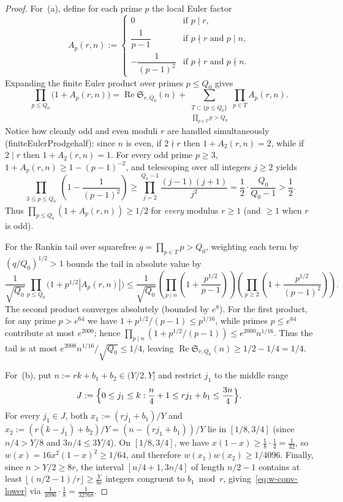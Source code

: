 \documentclass[11pt,reqno]{amsart}
\numberwithin{equation}{section}
\theoremstyle{definition}
\newcommand{\1}{\mathbf{1}}
\newcommand{\Sing}{\mathfrak{S}}
\renewcommand{\Re}{\operatorname{Re}}
\newcommand{\lean}[1]{{\footnotesize\ttfamily\renewcommand{\_}{\textunderscore\allowbreak}#1}}
\begin{document}
\begin{proof}
For~(a), define for each prime $p$ the local Euler factor
\[
  A_p(r, n) := \begin{cases}
    0 & \text{if } p \mid r,\\
    \dfrac{1}{p - 1} & \text{if } p \nmid r \text{ and } p \mid n,\\
    -\dfrac{1}{(p - 1)^2} & \text{if } p \nmid r \text{ and } p \nmid n.
  \end{cases}
\]
Expanding the finite Euler product over primes $p \le Q_0$ gives
\[
  \prod_{p \le Q_0} \bigl(1 + A_p(r, n)\bigr) = \Re \Sing_{r, Q_0}(n) + \sum_{\substack{T \subset \{p \le Q_0\} \\ \prod_{p \in T} p > Q_0}} \prod_{p \in T} A_p(r, n).
\]
Notice how cleanly odd and even moduli $r$ are handled simultaneously (\lean{finiteEulerProd\_ge\_half}): since $n$ is even, if $2 \nmid r$ then $1 + A_2(r, n) = 2$, while if $2 \mid r$ then $1 + A_2(r, n) = 1$. For every odd prime $p \ge 3$, $1 + A_p(r, n) \ge 1 - (p-1)^{-2}$, and telescoping over all integers $j \ge 2$ yields
\[
  \prod_{\substack{3 \le p \le Q_0}} \left(1 - \frac{1}{(p-1)^2}\right)
  \ge \prod_{j=2}^{Q_0 - 1} \frac{(j-1)(j+1)}{j^2}
  = \frac{1}{2}\cdot \frac{Q_0}{Q_0 - 1} > \frac{1}{2}.
\]
Thus $\prod_{p \le Q_0}(1 + A_p(r, n)) \ge 1/2$ for \emph{every} modulus $r \ge 1$ (and $\ge 1$ when $r$ is odd).

For the Rankin tail over squarefree $q = \prod_{p \in T} p > Q_0$, weighting each term by $(q/Q_0)^{1/2} > 1$ bounds the tail in absolute value by
\[
  \frac{1}{\sqrt{Q_0}} \prod_{p \le Q_0} \bigl(1 + p^{1/2}|A_p(r, n)|\bigr)
  \le \frac{1}{\sqrt{Q_0}} \left(\prod_{p \mid n} \left(1 + \frac{p^{1/2}}{p-1}\right)\right)
      \left(\prod_{p \ge 2} \left(1 + \frac{p^{1/2}}{(p-1)^2}\right)\right).
\]
The second product converges absolutely (bounded by $e^8$). For the first product, for any prime $p > e^{64}$ we have $1 + p^{1/2}/(p-1) \le p^{1/16}$, while primes $p \le e^{64}$ contribute at most $e^{2000}$; hence $\prod_{p \mid n}(1 + p^{1/2}/(p-1)) \le e^{2000} n^{1/16}$. Thus the tail is at most $e^{2008} n^{1/16} / \sqrt{Q_0} \le 1/4$, leaving $\Re \Sing_{r, Q_0}(n) \ge 1/2 - 1/4 = 1/4$.

For~(b), put $n := r k + b_1 + b_2 \in (Y/2, Y]$ and restrict $j_1$ to the middle range
\[
  J := \Bigl\{0 \le j_1 \le k : \frac{n}{4} + 1 \le r j_1 + b_1 \le \frac{3n}{4}\Bigr\}.
\]
For every $j_1 \in J$, both $x_1 := (r j_1 + b_1)/Y$ and $x_2 := (r(k - j_1) + b_2)/Y = (n - (r j_1 + b_1))/Y$ lie in $[1/8, 3/4]$ (since $n/4 > Y/8$ and $3n/4 \le 3Y/4$). On $[1/8, 3/4]$, we have $x(1-x) \ge \frac{1}{8}\cdot\frac{1}{4} = \frac{1}{32}$, so $w(x) = 16 x^2(1-x)^2 \ge 1/64$, and therefore $w(x_1)w(x_2) \ge 1/4096$. Finally, since $n > Y/2 \ge 8r$, the interval $[n/4 + 1, 3n/4]$ of length $n/2 - 1$ contains at least $\lfloor (n/2 - 1)/r \rfloor \ge \frac{Y}{8r}$ integers congruent to $b_1 \bmod r$, giving~\eqref{eq:w-conv-lower} via $\frac{1}{4096}\cdot \frac{1}{8} = \frac{1}{32768}$.
\end{proof}
\end{document}
